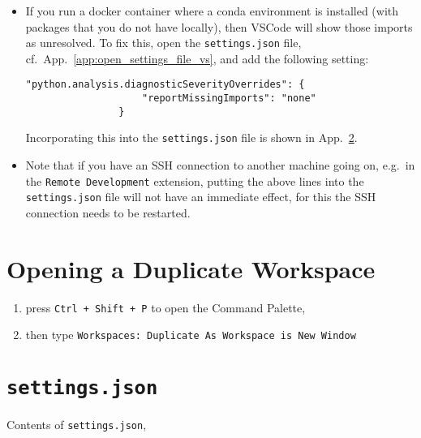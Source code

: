 \documentclass[12pt, a4paper]{scrbook}
\numberwithin{equation}{section}
\theoremstyle{definition}
\theoremstyle{definition}
\begin{document}
		\begin{itemize}
			\item If you run a docker container where a conda environment is installed (with packages that you do not have locally), then VSCode will show those imports as unresolved. To fix this, open the \texttt{settings.json} file, cf.~App.~\ref{app:open_settings_file_vs}, and add the following setting: 
			
			\begin{lstlisting}[style=mystylepython, label=alg:vscode_pylance__unresolved_imports, xleftmargin=\parindent]
				"python.analysis.diagnosticSeverityOverrides": {
				    "reportMissingImports": "none"                          
				}
			\end{lstlisting}
			
			Incorporating this into the \texttt{settings.json} file is shown in App.~\ref{app:vscode__settings_file}.
			
			\item Note that if you have an SSH connection to another machine going on, e.g.~in the \texttt{Remote Development} extension, putting the above lines into the \texttt{settings.json} file will not have an immediate effect, for this the SSH connection needs to be restarted.
			
		\end{itemize}
	
	\section{Opening a Duplicate Workspace}
	
	\begin{enumerate}
		\item press \texttt{Ctrl + Shift + P} to open the Command Palette, 
		\item then type \texttt{Workspaces:~Duplicate As Workspace is New Window}
	\end{enumerate}
	
	\section{\texttt{settings.json}} \label{app:vscode__settings_file}
		Contents of \texttt{settings.json},
	
\end{document}
